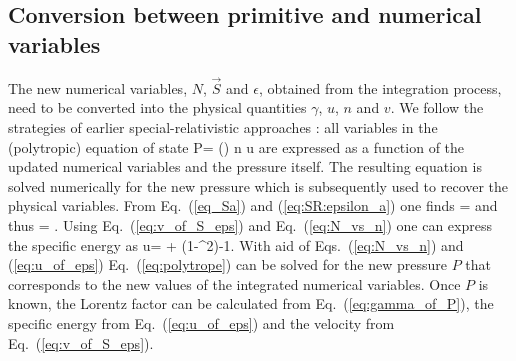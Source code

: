 \documentclass{elsart}
\begin{document}
\subsection{Conversion between primitive and numerical variables}
The new numerical variables, $N$, $\vec{S}$ and $\epsilon$, obtained from 
the integration process, need to be converted into the physical quantities $\gamma$, $u$,
$n$ and $v$. We follow the strategies of earlier special-relativistic approaches \cite{marti96,monaghan97}: all variables in the (polytropic) equation of state
\be
P= () n u 
\label{eq:polytrope}
\ee
are expressed as a function of the updated numerical variables and the pressure 
itself. The resulting equation is solved numerically for the new pressure which
is subsequently used to recover the physical variables.
From Eq.~(\ref{eq_Sa}) and (\ref{eq:SR:epsilon_a}) one finds
\be
{}= 
\label{eq:v_of_S_eps}
\ee
and thus 
\be
\gamma= .
\label{eq:gamma_of_P}
\ee
Using Eq.~(\ref{eq:v_of_S_eps}) and Eq.~(\ref{eq:N_vs_n}) one can express the
specific energy as
\be
u= \frac{\epsilon}{\gamma} +  (1-\gamma^2)-1. 
\label{eq:u_of_eps}
\ee
With aid of Eqs.~(\ref{eq:N_vs_n}) and (\ref{eq:u_of_eps})
Eq.~(\ref{eq:polytrope}) can be solved for the new pressure $P$ 
that corresponds to the new values of the integrated numerical variables. Once $P$ is
known, the Lorentz factor can be calculated from Eq.~(\ref{eq:gamma_of_P}),
the specific energy from Eq.~(\ref{eq:u_of_eps}) and the velocity from
Eq.~(\ref{eq:v_of_S_eps}). 
\end{document}

